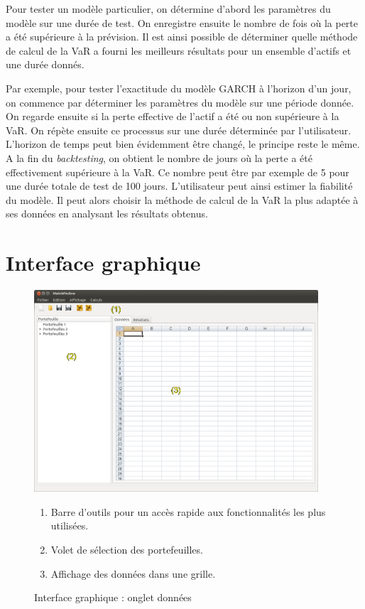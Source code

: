 		Pour tester un modèle particulier, on détermine d'abord les paramètres du modèle sur une durée de test. On enregistre ensuite le nombre de fois où la perte a été supérieure à la prévision. Il est ainsi possible de déterminer quelle méthode de calcul de la VaR a fourni les meilleurs résultats pour un ensemble d'actifs et une durée donnés.

		Par exemple, pour tester l'exactitude du modèle GARCH à l'horizon d'un jour, on commence par déterminer les paramètres du modèle sur une période donnée. On regarde ensuite si la perte effective de l'actif a été ou non supérieure à la VaR. On répète ensuite ce processus sur une durée déterminée par l'utilisateur. L'horizon de temps peut bien évidemment être changé, le principe reste le même. A la fin du \textit{backtesting}, on obtient le nombre de jours où la perte a été effectivement supérieure à la VaR. Ce nombre peut être par exemple de 5 pour une durée totale de test de 100 jours. L'utilisateur peut ainsi estimer la fiabilité du modèle. Il peut alors choisir la méthode de calcul de la VaR la plus adaptée à ses données en analysant les résultats obtenus.


\newpage

\section{Interface graphique}

	\begin{figure}[ht]
		\includegraphics[width=400px]{logicielDonnees.png}
		\caption{Interface graphique : onglet données}
		\label{interface}
		\begin{enumerate}
			\item Barre d'outils pour un accès rapide aux fonctionnalités les plus utilisées.
			\item Volet de sélection des portefeuilles.
			\item Affichage des données dans une grille. 
		\end{enumerate}
	\end{figure}

